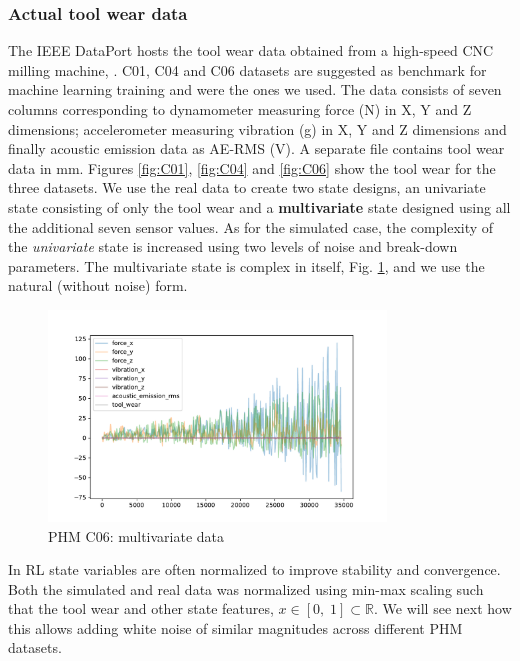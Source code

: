 \documentclass[a4paper, 12pt]{article}
\begin{document}
\subsubsection*{Actual tool wear data}
The IEEE DataPort hosts the tool wear data obtained from a high-speed CNC milling machine, \citep{NUAA-dataset}. C01, C04 and C06 datasets are suggested as benchmark for machine learning training and were the ones we used. The data consists of seven columns corresponding to dynamometer measuring force (N) in X, Y and Z dimensions; accelerometer measuring vibration (g) in X, Y and Z dimensions and finally acoustic emission data as AE-RMS (V). A separate file contains tool wear data in mm. Figures \ref{fig:C01}, \ref{fig:C04} and \ref{fig:C06} show the tool wear for the three datasets. We use the real data to create two state designs, an univariate state consisting of only the tool wear and a \textbf{multivariate} state designed using all the additional seven sensor values. As for the simulated case, the complexity of the \textit{univariate} state is increased using two levels of noise and break-down parameters. The multivariate state is complex in itself, Fig. \ref{fig:PHMMSdata}, and we use the natural (without noise) form.

\begin{figure}[ht]
	\centering
	\includegraphics[width=0.8\textwidth]{PHMMSdata.pdf}  
	\caption{PHM C06: multivariate data}
	\label{fig:PHMMSdata}
\end{figure} 

In RL state variables are often normalized to improve stability and convergence. Both the simulated and real data was normalized using min-max scaling such that the tool wear and other state features, $x \in [0,\;1] \subset \mathbb{R} $. We will see next how this allows adding white noise of similar magnitudes across different PHM datasets.
\end{document}
